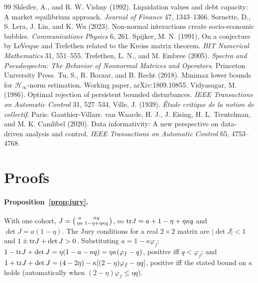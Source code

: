\documentclass[12pt]{article}
\theoremstyle{definition}
\theoremstyle{remark}
\begin{document}
\begin{thebibliography}{99}
 Shleifer, A., and R. W. Vishny (1992). Liquidation values and debt capacity: A market equilibrium approach. \emph{Journal of Finance} 47, 1343--1366.
 Sornette, D., S. Lera, J. Lin, and K. Wu (2023). Non-normal interactions create socio-economic bubbles. \emph{Communications Physics} 6, 261.
 Spijker, M. N. (1991). On a conjecture by LeVeque and Trefethen related to the Kreiss matrix theorem. \emph{BIT Numerical Mathematics} 31, 551--555.
 Trefethen, L. N., and M. Embree (2005). \emph{Spectra and Pseudospectra: The Behavior of Nonnormal Matrices and Operators}. Princeton University Press.
 Tu, S., R. Boczar, and B. Recht (2018). Minimax lower bounds for $\mathcal H_\infty$-norm estimation. Working paper, arXiv:1809.10855.
 Vidyasagar, M. (1986). Optimal rejection of persistent bounded disturbances. \emph{IEEE Transactions on Automatic Control} 31, 527--534.
 Ville, J. (1939). \emph{\'Etude critique de la notion de collectif}. Paris: Gauthier-Villars.
 van Waarde, H. J., J. Eising, H. L. Trentelman, and M. K. Camlibel (2020). Data informativity: A new perspective on data-driven analysis and control. \emph{IEEE Transactions on Automatic Control} 65, 4753--4768.
\end{thebibliography}

\appendix
\section{Proofs}\label{app:proofs}

\paragraph{Proposition~\ref{prop:jury}.} With one cohort, $J=\begin{psmallmatrix}a&\kappa q\\ \eta a&1-\eta+\eta\kappa q\end{psmallmatrix}$, so ${\rm tr}J=a+1-\eta+\eta\kappa q$ and $\det J=a(1-\eta)$. The Jury conditions for a real $2\times2$ matrix are $|\det J|<1$ and $1\pm{\rm tr}J+\det J>0$. Substituting $a=1-\kappa\varphi_f$: $1-{\rm tr}J+\det J=\eta(1-a-\kappa q)=\eta\kappa(\varphi_f-q)$, positive iff $q<\varphi_f$; and $1+{\rm tr}J+\det J=(4-2\eta)-\kappa[(2-\eta)\varphi_f-\eta q]$, positive iff the stated bound on $\kappa$ holds (automatically when $(2-\eta)\varphi_f\le\eta q$).
\end{document}
